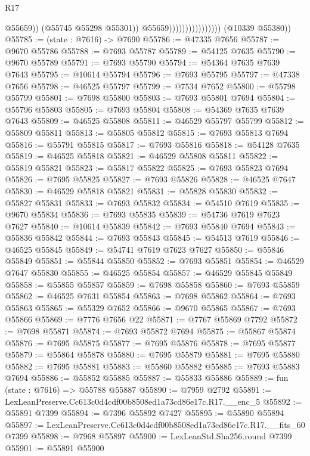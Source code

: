 \begin{lexlean}{R17}
\begin{coremodule}
                                            @55659))
                                        (@55745 @55298 @55301))
                                      @55659))))))))))))))))
      (@10339 @55380))
@55785 := (state : @7616) -> @7690
@55786 := @47335 @7656
@55787 := @9670 @55786
@55788 := @7693 @55787
@55789 := @54125 @7635
@55790 := @9670 @55789
@55791 := @7693 @55790
@55794 := @54364 @7635 @7639 @7643
@55795 := @10614 @55794
@55796 := @7693 @55795
@55797 := @47338 @7656
@55798 := @46525 @55797
@55799 := @7534 @7652
@55800 := @55798 @55799
@55801 := @7698 @55800
@55803 := @7693 @55801 @7694
@55804 := @55796 @55803
@55805 := @7693 @55804
@55808 := @54369 @7635 @7639 @7643
@55809 := @46525 @55808
@55811 := @46529 @55797 @55799
@55812 := @55809 @55811
@55813 := @55805 @55812
@55815 := @7693 @55813 @7694
@55816 := @55791 @55815
@55817 := @7693 @55816
@55818 := @54128 @7635
@55819 := @46525 @55818
@55821 := @46529 @55808 @55811
@55822 := @55819 @55821
@55823 := @55817 @55822
@55825 := @7693 @55823 @7694
@55826 := @7695 @55825
@55827 := @7693 @55826
@55828 := @46525 @7647
@55830 := @46529 @55818 @55821
@55831 := @55828 @55830
@55832 := @55827 @55831
@55833 := @7693 @55832
@55834 := @54510 @7619
@55835 := @9670 @55834
@55836 := @7693 @55835
@55839 := @54736 @7619 @7623 @7627
@55840 := @10614 @55839
@55842 := @7693 @55840 @7694
@55843 := @55836 @55842
@55844 := @7693 @55843
@55845 := @54513 @7619
@55846 := @46525 @55845
@55849 := @54741 @7619 @7623 @7627
@55850 := @55846 @55849
@55851 := @55844 @55850
@55852 := @7693 @55851
@55854 := @46529 @7647 @55830
@55855 := @46525 @55854
@55857 := @46529 @55845 @55849
@55858 := @55855 @55857
@55859 := @7698 @55858
@55860 := @7693 @55859
@55862 := @46525 @7631 @55854
@55863 := @7698 @55862
@55864 := @7693 @55863
@55865 := @55329 @7652
@55866 := @9670 @55865
@55867 := @7693 @55866
@55869 := @7776 @7656 @22
@55871 := @7767 @55869 @7792
@55872 := @7698 @55871
@55874 := @7693 @55872 @7694
@55875 := @55867 @55874
@55876 := @7695 @55875
@55877 := @7695 @55876
@55878 := @7695 @55877
@55879 := @55864 @55878
@55880 := @7695 @55879
@55881 := @7695 @55880
@55882 := @7695 @55881
@55883 := @55860 @55882
@55885 := @7693 @55883 @7694
@55886 := @55852 @55885
@55887 := @55833 @55886
@55889 := fun (state : @7616) => @55788 @55887
@55890 := @7959 @2792
@55891 := LexLeanPreserve.Cc613c0d4cdf00b8508ed1a73cd86e17c.R17.__enc_5
@55892 := @55891 @7399
@55894 := @7396 @55892 @7427
@55895 := @55890 @55894
@55897 := LexLeanPreserve.Cc613c0d4cdf00b8508ed1a73cd86e17c.R17.__fits_60 @7399
@55898 := @7968 @55897
@55900 := LexLeanStd.Sha256.round @7399
@55901 := @55891 @55900

\end{coremodule}
\end{lexlean}
